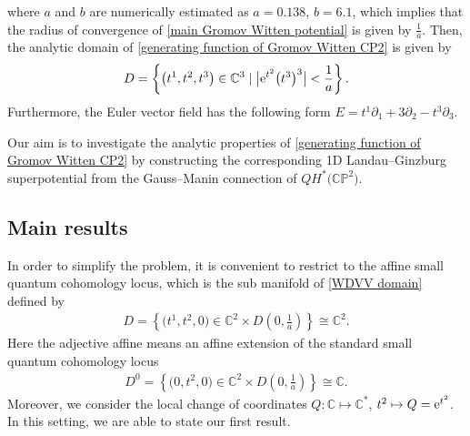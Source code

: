 \documentclass[pdftex]{sigma}
\numberwithin{equation}{section}
\begin{document}
where $a$ and $b$ are numerically estimated as
$a = 0.138$, $ b = 6.1$,
which implies that the radius of convergence of \eqref{main Gromov Witten potential} is given by $\frac{1}{a}$. Then, the analytic domain of \eqref{generating function of Gromov Witten CP2} is given by
\begin{gather}\label{WDVV domain}
D = \left\{\bigl(t^1, t^2, t^3\bigr) \in \mathbb{C}^3 \mid \big|{\rm e}^{t^2}\bigl(t^3\bigr)^3\big| < \frac{1}{a}\right\}.
\end{gather}
Furthermore, the Euler vector field has the following form
$E = t^1\partial_1 + 3\partial_2 - t^3\partial_3$.

Our aim is to investigate the analytic properties of \eqref{generating function of Gromov Witten CP2} by constructing the corresponding 1D Landau--Ginzburg superpotential from the Gauss--Manin connection of $QH^{*}\bigl(\mathbb{CP}^2\bigr)$.

\subsection{Main results}
In order to simplify the problem, it is convenient to restrict to the affine small quantum cohomology locus, which is the sub manifold of \eqref{WDVV domain} defined by
\begin{gather*}
D=\left\{ \bigl(t^1,t^2,0\bigr) \in \mathbb{C}^2\times D\left(0,\frac{1}{a}\right) \right\}\cong \mathbb{C}^2.
\end{gather*}
Here the adjective affine means an affine extension of the standard small quantum cohomology locus
\begin{gather*}
D^0=\left\{ \bigl(0,t^2,0\bigr) \in \mathbb{C}^2\times D\left(0,\frac{1}{a}\right) \right\}\cong \mathbb{C}.
\end{gather*}
Moreover, we consider the local change of coordinates
$
Q\colon \mathbb{C}\mapsto \mathbb{C}^{*}$, $ t^2\mapsto Q={\rm e}^{t^2}$.
In this setting, we are able to state our first result.
\end{document}

